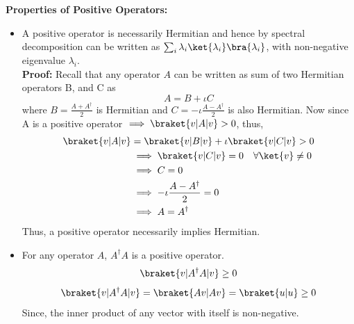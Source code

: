 \documentclass[12pt, oneside]{book}
\theoremstyle{definition}
\theoremstyle{definition}
\theoremstyle{remark}
\begin{document}
\textbf{Properties of Positive Operators: }
\begin{itemize}
    \item A positive operator is necessarily Hermitian and hence by spectral decomposition can be written as $\sum_i \lambda_i\ket{\lambda_i}\bra{\lambda_i}$, with non-negative eigenvalue $\lambda_i$.\\
    \textbf{Proof: } Recall that any operator $A$ can be written as sum of two Hermitian operators B, and C as
    \[
    A=B+\iota C
    \]
    where $B=\frac{A+A^{\dagger}}{2}$ is Hermitian and $C=-\iota\frac{A-A^{\dagger}}{2}$ is also Hermitian. Now since A is a positive operator $\implies \braket{v|A|v} > 0$, thus,
    \begin{align*}
    \braket{v|A|v}&=\braket{v|B|v} +\iota \braket{v|C|v} > 0\\
    &\implies \braket{v|C|v}=0 \quad \forall \ket{v} \neq 0\\
    &\implies C=0\\
    &\implies -\iota \frac{A-A^{\dagger}}{2}=0\\
    &\implies A=A^{\dagger}
    \end{align*}
    Thus, a positive operator necessarily implies Hermitian.
    \item For any operator $A$, $A^{\dagger}A$ is a positive operator.
    \[ \braket{v|A^{\dagger}A|v} \geq 0 \]
    \[ \braket{v|A^{\dagger}A|v}=\braket{Av|Av} = \braket{u|u} \geq 0 \]
    Since, the inner product of any vector with itself is non-negative.
\end{itemize}
\end{document}
